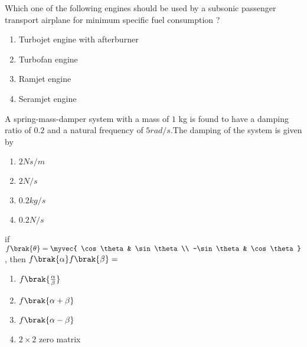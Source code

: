 \iffalse
\chapter{2007}
\author{ee24btech11058}
\section{ae}
\fi
 
     \item Which one of the following engines should be used by a subsonic passenger transport airplane for minimum specific fuel consumption ?
     \begin{enumerate}
         \item Turbojet engine with afterburner
         \item Turbofan engine
         \item Ramjet engine
         \item Seramjet engine\\
     \end{enumerate}

     \item A spring-mass-damper system with a mass of $1$ kg is found to have a damping ratio of $0.2$ and a natural frequency of $5 rad/s$.The damping of the system is given by
     \begin{enumerate}
         \item $2 Ns/m$
         \item $2 N/s$
         \item $0.2 kg/s$
         \item $0.2 N/s$ \\    
     \end{enumerate}

    \item if $f\brak{\theta} = \myvec{ \cos\theta & \sin\theta \\ -\sin\theta & \cos\theta}$, then $f\brak{\alpha} f\brak{\beta} =$
    \begin{enumerate}
        \item $f\brak{\frac{\alpha}{\beta}}$
        \item $f\brak{\alpha +\beta}$
        \item $f\brak{\alpha - \beta}$
        \item $2 \times 2 $ zero matrix \\     
    \end{enumerate}

